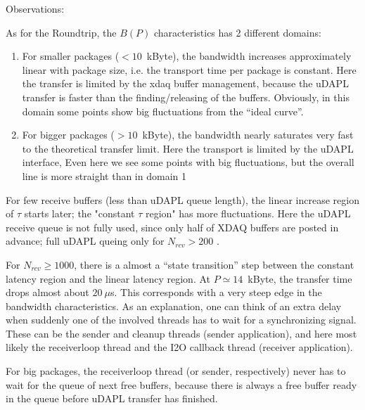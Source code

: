 Observations:
\begin{compactitem}

\item As for the Roundtrip, the $B(P)$ characteristics has 2
different domains:
\begin{enumerate}
\item For smaller packages ($< 10$~kByte), the bandwidth increases 
approximately linear with package size, i.e. the transport time per package 
is constant. Here the transfer is limited by the xdaq buffer management, 
because the uDAPL transfer is faster than the 
finding/releasing of the buffers. Obviously, in this domain
some points show big fluctuations from the ``ideal curve''.

\item For bigger packages ($>10$~kByte), the bandwidth nearly 
saturates very fast to the theoretical transfer limit. 
Here the transport is limited by the uDAPL interface, 
Even here we see some points with big fluctuations, 
but the overall line is more straight than in domain 1 

\end{enumerate}

\item For few receive buffers (less than uDAPL queue length), 
the linear increase region of $\tau$ starts later; 
the "constant $\tau$  region" has more fluctuations. 
Here the uDAPL receive queue is not fully used, 
since only half of XDAQ buffers are posted in advance; 
full uDAPL queing only for  $N_{rcv}> 200$ .

\item For $N_{rcv} \geq 1000$, there is a almost a ``state transition''
step between the constant latency region and the linear latency 
region. At $P\simeq 14$~kByte, the transfer time drops almost
about $20~\mu$s. This corresponds with a very steep edge 
in the bandwidth characteristics. As an explanation,
one can think of an extra delay when suddenly one of the
involved threads has to wait for a synchronizing signal.
These can be the sender and cleanup threads (sender application),
and here most likely the receiverloop thread and the I2O
callback thread (receiver application).

For big packages, the receiverloop thread (or sender, respectively) 
never has to wait for the queue of next free buffers, 
because there is always a
free buffer ready in the queue before uDAPL transfer has finished.


\end{compactitem}
